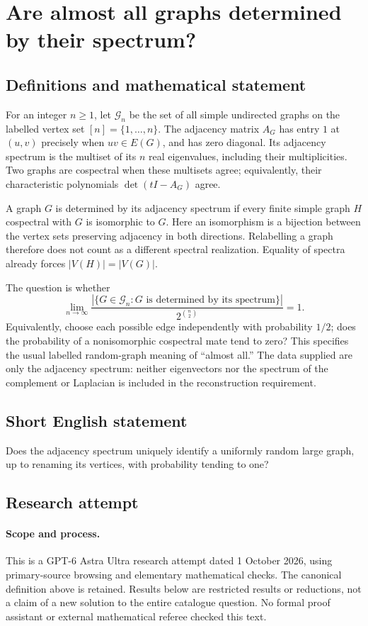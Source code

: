 \documentclass[11pt,a4paper]{article}
\begin{document}
\section*{Are almost all graphs determined by their spectrum?}\label{statement}

\subsection{Definitions and mathematical statement}
For an integer $n\geq1$, let $\mathcal G_n$ be the set of all simple
undirected graphs on the labelled vertex set $[n]=\{1,\ldots,n\}$.
The adjacency matrix $A_G$ has entry $1$ at $(u,v)$ precisely when
$uv\in E(G)$, and has zero diagonal. Its adjacency spectrum is the
multiset of its $n$ real eigenvalues, including their multiplicities.
Two graphs are cospectral when these multisets agree; equivalently,
their characteristic polynomials $\det(tI-A_G)$ agree.

A graph $G$ is determined by its adjacency spectrum if every finite
simple graph $H$ cospectral with $G$ is isomorphic to $G$. Here an
isomorphism is a bijection between the vertex sets preserving adjacency
in both directions. Relabelling a graph therefore does not count as a
different spectral realization. Equality of spectra already forces
$|V(H)|=|V(G)|$.

The question is whether
\[
 \lim_{n\to\infty}
 \frac{|\{G\in\mathcal G_n:G\text{ is determined by its spectrum}\}|}
 {2^{\binom n2}}=1.
\]
Equivalently, choose each possible edge independently with probability
$1/2$; does the probability of a nonisomorphic cospectral mate tend to
zero? This specifies the usual labelled random-graph meaning of
``almost all.'' The data supplied are only the adjacency spectrum:
neither eigenvectors nor the spectrum of the complement or Laplacian
is included in the reconstruction requirement.
\subsection{Short English statement}
Does the adjacency spectrum uniquely identify a uniformly random large graph, up to renaming its vertices, with probability tending to one?
\subsection{Research attempt}
\paragraph{Scope and process.}
This is a GPT-6 Astra Ultra research attempt dated 1 October 2026, using
primary-source browsing and elementary mathematical checks. The canonical
definition above is retained. Results below are restricted results or
reductions, not a claim of a new solution to the entire catalogue question.
No formal proof assistant or external mathematical referee checked this text.
\end{document}
